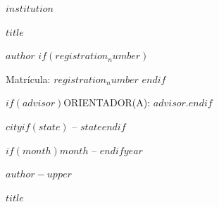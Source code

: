 
\thispagestyle{empty}

\begin{center}
$institution$
\end{center}

\vspace{5.0cm}

\begin{center}
    \textbf{$title$}
\end{center}

\vspace{5.0cm}

\begin{center}
$author$
$if(registration_number)$

Matrícula: $registration_number$
$endif$
\end{center}

\vspace{6cm}

\begin{center}
$if(advisor)$ORIENTADOR(A): $advisor$.$endif$
\end{center}

\vspace{2cm}

\begin{center}
$city$$if(state)$ -- $state$$endif$

$if(month)$$month$ -- $endif$$year$
\end{center}

\newpage

\thispagestyle{empty}

\begin{center}
$author-upper$
\end{center}

\vspace{4.0cm}

\begin{center}
    \textbf{$title$}
\end{center}

\vspace{4.0cm}

